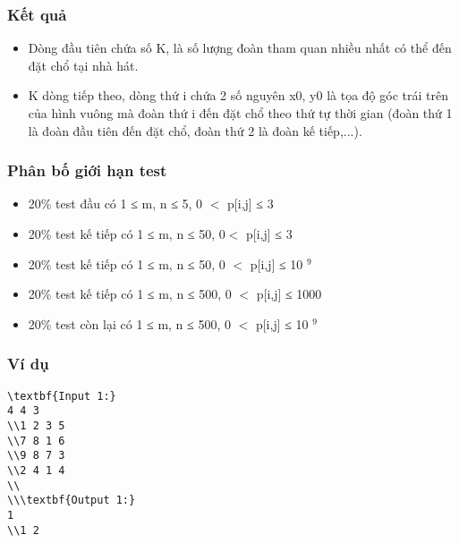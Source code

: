 \subsubsection{   Kết quả  }
\begin{itemize}
	\item     Dòng đầu tiên chứa số K, là số lượng đoàn tham quan nhiều nhất có thể đến đặt chổ tại nhà hát.   
	\item     K dòng tiếp theo, dòng thứ i chứa 2 số nguyên x0, y0 là tọa độ góc trái trên của hình vuông mà đoàn thứ i đến đặt chổ theo thứ tự thời gian (đoàn thứ 1 là đoàn đầu tiên đến đặt chổ, đoàn thứ 2 là đoàn kế tiếp,...).   
\end{itemize}

\subsubsection{   Phân bố giới hạn test  }
\begin{itemize}
	\item     20\% test đầu có 1 ≤ m, n ≤ 5, 0 $<$ p[i,j] ≤ 3   
	\item     20\% test kế tiếp có 1 ≤ m, n ≤ 50, 0$<$ p[i,j] ≤ 3   
	\item     20\% test kế tiếp có 1 ≤ m, n ≤ 50, 0 $<$ p[i,j] ≤ 10    $^     9    $
	\item     20\% test kế tiếp có 1 ≤ m, n ≤ 500, 0 $<$ p[i,j] ≤ 1000   
	\item     20\% test còn lại có 1 ≤ m, n ≤ 500, 0 $<$ p[i,j] ≤ 10    $^     9    $
\end{itemize}

\subsubsection{   Ví dụ  }
\begin{verbatim}
\textbf{Input 1:}
4 4 3
\\1 2 3 5
\\7 8 1 6
\\9 8 7 3
\\2 4 1 4
\\
\\\textbf{Output 1:}
1
\\1 2\end{verbatim}

